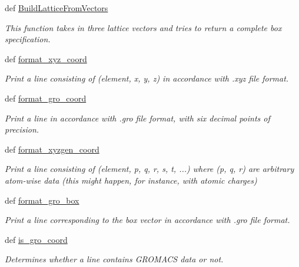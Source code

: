 \begin{DoxyCompactItemize}
def \hyperlink{namespaceforcebalance_1_1molecule_a29fb1ac9324f4280f07c65baea339989}{Build\-Lattice\-From\-Vectors}
\begin{DoxyCompactList}\small\item\em This function takes in three lattice vectors and tries to return a complete box specification. \end{DoxyCompactList}\item 
def \hyperlink{namespaceforcebalance_1_1molecule_a2eba3cad44138b3b10ea883240888412}{format\-\_\-xyz\-\_\-coord}
\begin{DoxyCompactList}\small\item\em Print a line consisting of (element, x, y, z) in accordance with .xyz file format. \end{DoxyCompactList}\item 
def \hyperlink{namespaceforcebalance_1_1molecule_a41c13064e4285973aa6c49369d3d3390}{format\-\_\-gro\-\_\-coord}
\begin{DoxyCompactList}\small\item\em Print a line in accordance with .gro file format, with six decimal points of precision. \end{DoxyCompactList}\item 
def \hyperlink{namespaceforcebalance_1_1molecule_a4948e4662b8d2c8d515427d1bbb3d01e}{format\-\_\-xyzgen\-\_\-coord}
\begin{DoxyCompactList}\small\item\em Print a line consisting of (element, p, q, r, s, t, ...) where (p, q, r) are arbitrary atom-\/wise data (this might happen, for instance, with atomic charges) \end{DoxyCompactList}\item 
def \hyperlink{namespaceforcebalance_1_1molecule_ae25aa5331b3a2dd0e9d1e184380357db}{format\-\_\-gro\-\_\-box}
\begin{DoxyCompactList}\small\item\em Print a line corresponding to the box vector in accordance with .gro file format. \end{DoxyCompactList}\item 
def \hyperlink{namespaceforcebalance_1_1molecule_a12b7bb398c2fa49a223f258ec7737483}{is\-\_\-gro\-\_\-coord}
\begin{DoxyCompactList}\small\item\em Determines whether a line contains G\-R\-O\-M\-A\-C\-S data or not. \end{DoxyCompactList}\item 

\end{DoxyCompactItemize}
